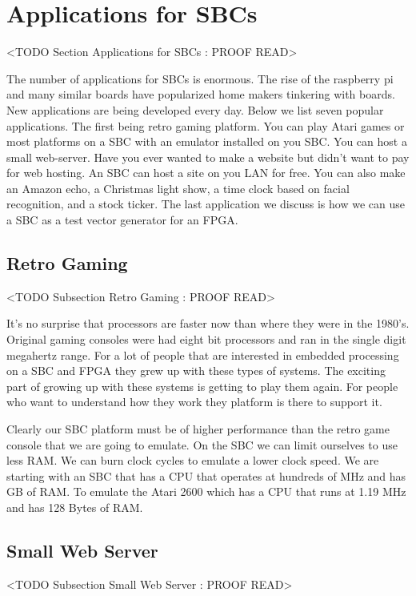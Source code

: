 \section{Applications for SBCs}
	<TODO Section Applications for SBCs : PROOF READ>
	
The number of applications for \ac{SBC}s is enormous. The rise of the raspberry pi and many similar boards have popularized home makers tinkering with boards. New applications are being developed every day.  Below we list seven popular applications. The first being retro gaming platform. You can play Atari games or most platforms on a \ac{SBC} with an emulator installed on you \ac{SBC}. You can host a small web-server. Have you ever wanted to make a website but didn't want to pay for web hosting. An \ac{SBC} can host a site on you \ac{LAN} for free. You can also make an Amazon echo, a Christmas light show, a time clock based on facial recognition, and a stock ticker. The last application we discuss is how we can use a \ac{SBC} as a test vector generator for an \ac{FPGA}. 

\subsection{Retro Gaming}
	<TODO Subsection Retro Gaming : PROOF READ>
	
It's no surprise that processors are faster now than where they were in the 1980's. Original gaming consoles were had eight bit processors and ran in the single digit megahertz range. For a lot of people that are interested in embedded processing on a \ac{SBC} and \ac{FPGA} they grew up with these types of systems. The exciting part of growing up with these systems is getting to play them again. For people who want to understand how they work they platform is there to support it.

Clearly our \ac{SBC} platform must be of higher performance than the retro game console that we are going to emulate. On the \ac{SBC} we can limit ourselves to use less \ac{RAM}. We can burn clock cycles to emulate a lower clock speed. We are starting with an \ac{SBC} that has a \ac{CPU} that operates at hundreds of \ac{MHz} and has \ac{GB} of \ac{RAM}. To emulate the Atari 2600 which has a \ac{CPU} that runs at 1.19 \ac{MHz} and has 128 Bytes of \ac{RAM}.

\subsection{Small Web Server}
	<TODO Subsection Small Web Server : PROOF READ>

